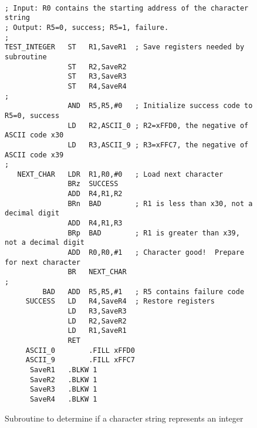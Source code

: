 \documentclass{patt}
\begin{document}
\begin{figure}[h!]
\begin{minipage}{36pc}
\begin{Verbatim}[fontsize=\fontsize{9}{11}\selectfont]

; Input: R0 contains the starting address of the character string
; Output: R5=0, success; R5=1, failure.
;
TEST_INTEGER   ST   R1,SaveR1  ; Save registers needed by subroutine 
               ST   R2,SaveR2
               ST   R3,SaveR3
               ST   R4,SaveR4
;
               AND  R5,R5,#0   ; Initialize success code to R5=0, success
               LD   R2,ASCII_0 ; R2=xFFD0, the negative of ASCII code x30
               LD   R3,ASCII_9 ; R3=xFFC7, the negative of ASCII code x39
;
   NEXT_CHAR   LDR  R1,R0,#0   ; Load next character
               BRz  SUCCESS
               ADD  R4,R1,R2
               BRn  BAD        ; R1 is less than x30, not a decimal digit
               ADD  R4,R1,R3   
               BRp  BAD        ; R1 is greater than x39, not a decimal digit 
               ADD  R0,R0,#1   ; Character good!  Prepare for next character
               BR   NEXT_CHAR
;
         BAD   ADD  R5,R5,#1   ; R5 contains failure code
     SUCCESS   LD   R4,SaveR4  ; Restore registers
               LD   R3,SaveR3
               LD   R2,SaveR2
               LD   R1,SaveR1
               RET
     ASCII_0        .FILL xFFD0
     ASCII_9        .FILL xFFC7
      SaveR1   .BLKW 1
      SaveR2   .BLKW 1
      SaveR3   .BLKW 1
      SaveR4   .BLKW 1

\end{Verbatim}
\caption{Subroutine to determine if a character string represents an integer}
\label{fig:test.for.integer}
\end{minipage}
\end{figure}
\end{document}
